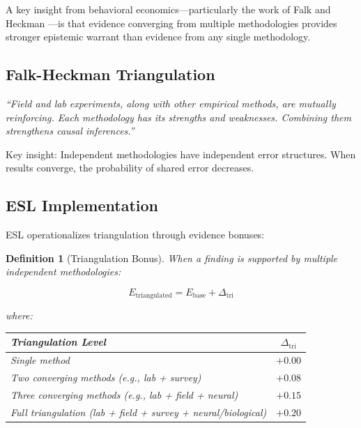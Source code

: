 \documentclass[11pt,a4paper]{article}
\newtheorem{definition}{Definition}[section]
\begin{document}
A key insight from behavioral economics---particularly the work of Falk and Heckman \citep{FalkHeckman2009}---is that evidence converging from multiple methodologies provides stronger epistemic warrant than evidence from any single methodology.

\subsection{Falk-Heckman Triangulation}

\begin{historicalbox}[title={Falk \& Heckman (2009): The Triangulation Argument}]
\textit{``Field and lab experiments, along with other empirical methods, are mutually reinforcing. Each methodology has its strengths and weaknesses. Combining them strengthens causal inferences.''}

Key insight: Independent methodologies have independent error structures. When results converge, the probability of shared error decreases.
\end{historicalbox}

\subsection{ESL Implementation}

ESL operationalizes triangulation through evidence bonuses:

\begin{definition}[Triangulation Bonus]
\label{def:triangulation}
When a finding is supported by multiple independent methodologies:

\begin{equation}
E_{\text{triangulated}} = E_{\text{base}} + \Delta_{\text{tri}}
\end{equation}

where:
\begin{center}
\begin{tabular}{lc}
\toprule
\textbf{Triangulation Level} & $\Delta_{\text{tri}}$ \\
\midrule
Single method & $+0.00$ \\
Two converging methods (e.g., lab + survey) & $+0.08$ \\
Three converging methods (e.g., lab + field + neural) & $+0.15$ \\
Full triangulation (lab + field + survey + neural/biological) & $+0.20$ \\
\bottomrule
\end{tabular}
\end{center}
\end{definition}
\end{document}
